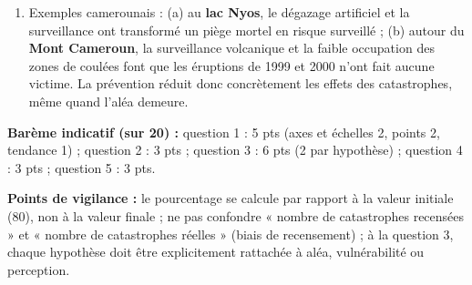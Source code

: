\documentclass[11pt]{article}
\begin{document}
\begin{corrige}
\begin{enumerate}
\item Exemples camerounais : (a) au \textbf{lac Nyos}, le dégazage artificiel et la surveillance ont transformé un piège mortel en risque surveillé ; (b) autour du \textbf{Mont Cameroun}, la surveillance volcanique et la faible occupation des zones de coulées font que les éruptions de 1999 et 2000 n'ont fait aucune victime. La prévention réduit donc concrètement les effets des catastrophes, même quand l'aléa demeure.
\end{enumerate}
\textbf{Barème indicatif (sur 20) :} question 1 : 5 pts (axes et échelles 2, points 2, tendance 1) ; question 2 : 3 pts ; question 3 : 6 pts (2 par hypothèse) ; question 4 : 3 pts ; question 5 : 3 pts.

\textbf{Points de vigilance :} le pourcentage se calcule par rapport à la valeur initiale (80), non à la valeur finale ; ne pas confondre « nombre de catastrophes recensées » et « nombre de catastrophes réelles » (biais de recensement) ; à la question 3, chaque hypothèse doit être explicitement rattachée à aléa, vulnérabilité ou perception.
\end{corrige}
\end{document}
